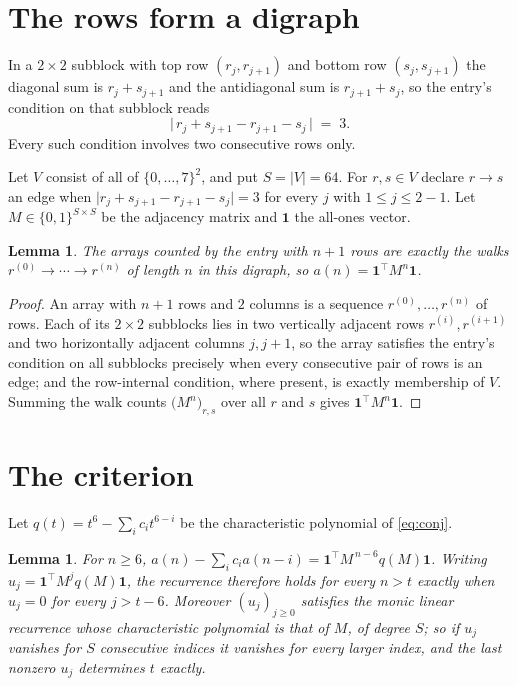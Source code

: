 \documentclass[11pt,a4paper]{article}
\theoremstyle{plain}
\newtheorem{lemma}[theorem]{Lemma}
\theoremstyle{definition}
\begin{document}
\section{The rows form a digraph}

In a $2\times2$ subblock with top row $(r_j,r_{j+1})$ and bottom row $(s_j,s_{j+1})$ the
diagonal sum is $r_j+s_{j+1}$ and the antidiagonal sum is $r_{j+1}+s_j$, so the entry's
condition on that subblock reads
\[
\bigl|\,r_j+s_{j+1}-r_{j+1}-s_j\,\bigr|\;=\;3.
\]
Every such condition involves two consecutive rows only.

Let $V$ consist of all of $\{0,\dots,7\}^{2}$, and put $S=|V|=64$. For $r,s\in V$ declare $r\to s$ an edge
when $\bigl|r_j+s_{j+1}-r_{j+1}-s_j\bigr|=3$ for every $j$ with
$1\le j\le2-1$. Let $M\in\{0,1\}^{S\times S}$ be the adjacency matrix and $\mathbf{1}$
the all-ones vector.

\begin{lemma}\label{lem:walk}
The arrays counted by the entry with $n+1$ rows are exactly the walks
$r^{(0)}\to\cdots\to r^{(n)}$ of length $n$ in this digraph, so
$a(n)=\mathbf{1}^{\!\top}M^{n}\mathbf{1}$.
\end{lemma}

\begin{proof}
An array with $n+1$ rows and $2$ columns is a sequence $r^{(0)},\dots,r^{(n)}$ of
rows. Each of its $2\times2$ subblocks lies in two vertically adjacent rows
$r^{(i)},r^{(i+1)}$ and two horizontally adjacent columns $j,j+1$, so the array satisfies
the entry's condition on all subblocks precisely when every consecutive pair of rows is an
edge; and the row-internal condition, where present, is exactly membership of $V$. Summing
the walk counts $\bigl(M^{n}\bigr)_{r,s}$ over all $r$ and $s$ gives
$\mathbf{1}^{\!\top}M^{n}\mathbf{1}$.
\end{proof}

\section{The criterion}

Let $q(t)=t^{6}-\sum_i c_i t^{6-i}$ be the characteristic polynomial of
\eqref{eq:conj}.

\begin{lemma}\label{lem:crit}
For $n\ge6$,
$a(n)-\sum_i c_i a(n-i)=\mathbf{1}^{\!\top}M^{\,n-6}q(M)\mathbf{1}$. Writing
$u_j=\mathbf{1}^{\!\top}M^{j}q(M)\mathbf{1}$, the recurrence therefore holds for every
$n>t$ exactly when $u_j=0$ for every $j>t-6$. Moreover $(u_j)_{j\ge0}$ satisfies the
monic linear recurrence whose characteristic polynomial is that of $M$, of degree $S$; so
if $u_j$ vanishes for $S$ consecutive indices it vanishes for every larger index, and the
last nonzero $u_j$ determines $t$ exactly.
\end{lemma}
\end{document}

